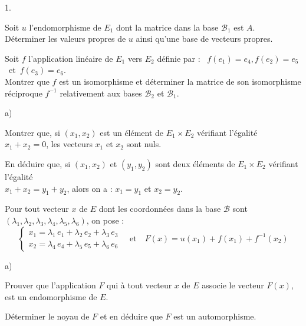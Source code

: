 \documentclass[11pt]{article}%
\begin{document}
\begin{noliste}{1.}
 \setlength{\itemsep}{4mm}
\item Soit $u$ l'endomorphisme de $E_{1}$ dont la matrice dans la base
$\mathcal{B}_{1}$ est $A$.\\
Déterminer les valeurs propres de $u$ ainsi qu'une base de vecteurs
propres.

\item Soit $f$ l'application linéaire de $E_{1}$ vers $E_{2}$ définie
par :
\ $f(e_{1}) = e_{4},f(e_{2}) = e_{5}$\ et\ $f(e_{3}) = e_{6}$.\\
Montrer que $f$ est un isomorphisme et déterminer la matrice de son
isomorphisme réciproque $f^{-1}$ relativement aux bases
$\mathcal{B}_{2}$ et 
$\mathcal{B}_{1}$.

\item \label{q3}

\begin{noliste}{a)}
 \setlength{\itemsep}{2mm}
\item Montrer que, si $(x_{1},x_{2})$ est un élément de $E_{1}\times
E_{2}$ vérifiant l'égalité \ $x_{1} + x_{2} = 0$, les vecteurs $x_{1}$
et $x_{2}$ sont
nuls.

\item En déduire que, si $(x_{1},x_{2})$ et $(y_{1},y_{2})$ sont deux
éléments de $E_{1}\times E_{2}$ vérifiant l'égalité \\
$x_{1} + x_{2} = y_{1} + y_{2}$, alors on a : $x_{1} = y_{1}$ et $x_{2}
= y_{2}$.
\end{noliste}

\item Pour tout vecteur $x$ de $E$ dont les coordonnées dans la base
$\mathcal{B}$ sont $(\lambda_{1},\lambda_{2},\lambda_{3},\lambda
_{4},\lambda_{5},\lambda_{6})$, on pose : 
\[
\left\{ 
\begin{array}{c}
x_{1} = \lambda_{1}\,e_{1} + \lambda_{2}\,e_{2} + \lambda_{3}\,e_{3} \\
x_{2} = \lambda_{4}\,e_{4} + \lambda_{5}\,e_{5} + \lambda_{6}\,e_{6}
\end{array}
\right. \quad \text{et}\quad F(x) = u(x_{1}) + f(x_{1}) + f^{-1}(x_{2})
\]

\begin{noliste}{a)}
 \setlength{\itemsep}{2mm}
\item Prouver que l'application $F$ qui à tout vecteur $x$ de $E$
associe le
vecteur $F(x)$, est un endomorphisme de $E$.

\item Déterminer le noyau de $F$ et en déduire que $F$ est un
automorphisme.


\end{noliste}
\end{noliste}
\end{document}

